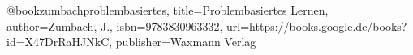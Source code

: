 
@book{zumbachproblembasiertes,
  title={Problembasiertes Lernen},
  author={Zumbach, J.},
  isbn={9783830963332},
  url={https://books.google.de/books?id=X47DrRaHJNkC},
  publisher={Waxmann Verlag}
}